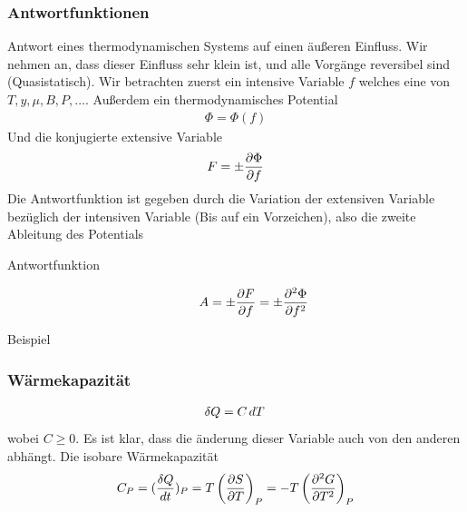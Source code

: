\subsubsection*{Antwortfunktionen}
Antwort eines thermodynamischen Systems auf einen äußeren Einfluss.
Wir nehmen an, dass dieser Einfluss sehr klein ist, und alle Vorgänge
reversibel sind (Quasistatisch). Wir betrachten zuerst ein intensive Variable
$f$ welches eine von $T, y, \mu, B, P, \ldots $.
Außerdem ein thermodynamisches Potential 
%
\begin{align*}
  \Phi = \Phi(f)
\end{align*}
%
Und die konjugierte extensive Variable 
%
\begin{align*}
  F = \pm \frac{\partial \Phi }{\partial f}
\end{align*}
%
Die Antwortfunktion ist gegeben durch die Variation der extensiven Variable
bezüglich der intensiven Variable (Bis auf ein Vorzeichen), also 
die zweite Ableitung des Potentials
\begin{description}
  \item[Antwortfunktion] 
    \begin{align*}
      A = \pm \frac{\partial F }{\partial f} = \pm \frac{\partial ^2 \Phi }{\partial f^2}
    \end{align*}
\end{description}
Beispiel
\subsubsection*{Wärmekapazität}
%
\begin{align*}
  \delta Q = C \,dT\,
\end{align*}
%
wobei $C \ge 0$.
Es ist klar, dass die änderung dieser Variable auch von den anderen abhängt.
Die isobare Wärmekapazität %
\begin{align*}
  C_P =(\frac{ \delta Q}{ \,dt\,})_P = T \left( \frac{\partial S }{\partial T} \right)_P =
  - T \left( \frac{\partial ^2 G }{\partial T^2} \right)_P
\end{align*}
%
